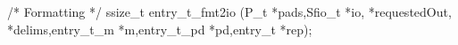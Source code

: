 \begin{code}
/* Formatting */
ssize\_t entry\_t\_fmt2io (P\_t *pads,Sfio\_t *io, *requestedOut,
                          *delims,entry\_t\_m *m,entry\_t\_pd *pd,entry\_t *rep);
\end{code}
